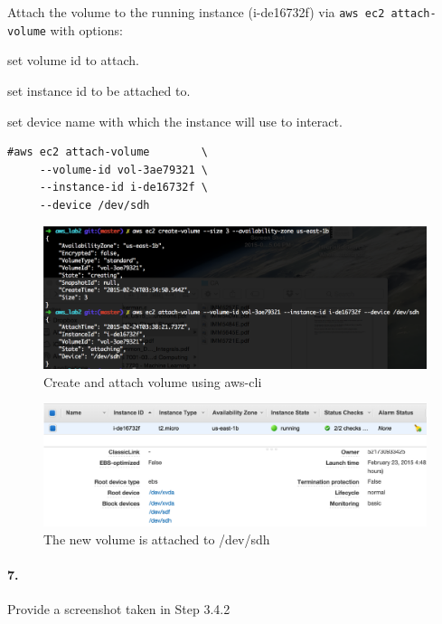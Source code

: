 \documentclass[a4paper]{article}
\begin{document}
Attach the volume to the running instance (i-de16732f) via \texttt{aws ec2 attach-volume} with options:
\begin{description}
\leftskip 0.4in
\parindent -0.4in
	\item[\texttt{--volume-id} : ] set volume id to attach.
	\item[\texttt{--instance-id} : ] set instance id to be attached to.
	\item[\texttt{--device} : ] set device name with which the instance will use to interact.
\end{description}
\begin{verbatim}
#aws ec2 attach-volume        \
     --volume-id vol-3ae79321 \
     --instance-id i-de16732f \
     --device /dev/sdh
\end{verbatim}
\begin{figure}[H]
  \centering
    \includegraphics[scale=.4]{attaching_volume.png}
  \caption{Create and attach volume using aws-cli}
\end{figure} 
\begin{figure}[H]
  \centering
    \includegraphics[scale=.4]{attached_volume.png}
  \caption{The new volume is attached to /dev/sdh}
\end{figure} 

\paragraph{7. } Provide a screenshot taken in Step 3.4.2 \\
\end{document}
